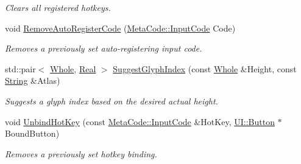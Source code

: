\begin{DoxyCompactItemize}
\begin{DoxyCompactList}\small\item\em Clears all registered hotkeys. \item\end{DoxyCompactList}\item 
void \hyperlink{classMezzanine_1_1UIManager_a38a2c2037d0f73c2ddae51b62b171815}{RemoveAutoRegisterCode} (\hyperlink{classMezzanine_1_1MetaCode_a3b5633f0145bf3287cf53a3f05b5563c}{MetaCode::InputCode} Code)
\begin{DoxyCompactList}\small\item\em Removes a previously set auto-\/registering input code. \item\end{DoxyCompactList}\item 
std::pair$<$ \hyperlink{namespaceMezzanine_adcbb6ce6d1eb4379d109e51171e2e493}{Whole}, \hyperlink{namespaceMezzanine_a726731b1a7df72bf3583e4a97282c6f6}{Real} $>$ \hyperlink{classMezzanine_1_1UIManager_aaf4698cd4bac16736c81134aa977a0f9}{SuggestGlyphIndex} (const \hyperlink{namespaceMezzanine_adcbb6ce6d1eb4379d109e51171e2e493}{Whole} \&Height, const \hyperlink{namespaceMezzanine_acf9fcc130e6ebf08e3d8491aebcf1c86}{String} \&Atlas)
\begin{DoxyCompactList}\small\item\em Suggests a glyph index based on the desired actual height. \item\end{DoxyCompactList}\item 
void \hyperlink{classMezzanine_1_1UIManager_aad7572eab280b81844c011cc28ca1be3}{UnbindHotKey} (const \hyperlink{classMezzanine_1_1MetaCode_a3b5633f0145bf3287cf53a3f05b5563c}{MetaCode::InputCode} \&HotKey, \hyperlink{classMezzanine_1_1UI_1_1Button}{UI::Button} $\ast$BoundButton)
\begin{DoxyCompactList}\small\item\em Removes a previously set hotkey binding. \item\end{DoxyCompactList}\end{DoxyCompactItemize}
